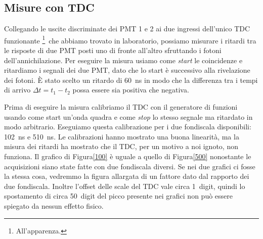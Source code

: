 \subsection{Misure con TDC}

Collegando le uscite discriminate dei PMT 1 e 2 ai due ingressi dell'unico TDC funzionante%
\footnote{All'apparenza.}%
\,che abbiamo trovato in laboratorio, possiamo misurare i ritardi tra le risposte di due PMT posti uno di fronte all'altro sfruttando i fotoni dell'annichilazione. Per eseguire la misura usiamo come \emph{start} le coincidenze e ritardiamo i segnali dei due PMT, dato che lo start è successivo alla rivelazione dei fotoni. \`E stato scelto un ritardo di \SI{60}{ns} in modo che la differenza tra i tempi di arrivo $\Delta t=t_1-t_2$ possa essere sia positiva che negativa.


Prima di eseguire la misura calibriamo il TDC con il generatore di funzioni usando come start un'onda quadra e come \emph{stop} lo stesso segnale ma ritardato in modo arbitrario.
Eseguiamo questa calibrazione per i due fondiscala disponibili: \SI{102}{ns} e \SI{510}{ns}.
Le calibrazioni hanno mostrato una buona linearità, ma la misura dei ritardi ha mostrato che il TDC, per un motivo a noi ignoto, non funziona.
Il grafico di Figura\autoref{100} è uguale a quello di Figura\autoref{500} nonostante le acquisizioni siano state fatte con due fondiscala diversi. Se nei due grafici ci fosse la stessa cosa, vedremmo la figura allargata di un fattore dato dal rapporto dei due fondiscala. Inoltre l'offset delle scale del TDC vale circa \SI{1}{digit}, quindi lo spostamento di circa \SI{50}{digit} del picco presente nei grafici non può essere spiegato da nessun effetto fisico.

